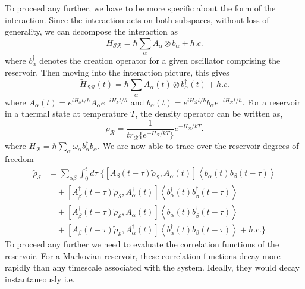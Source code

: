 To proceed any further, we have to be more specific about the form of the interaction. Since the interaction acts on both subspaces, without loss of generality, we can decompose the interaction as 
%
\begin{equation}\label{Tensor_Product_Interaction}
H_{\mathcal{SR}} = \hbar  \sum_\alpha A_\alpha \otimes b_\alpha^\dagger + h.c. 
\end{equation}
%
where $b_\alpha^\dagger$ denotes the creation operator for a given oscillator comprising the reservoir. Then moving into the interaction picture, this gives
\begin{equation}
\tilde{H}_{\mathcal{SR}}(t)  =  \hbar  \sum_\alpha A_\alpha(t) \otimes b_\alpha^\dagger(t) + h.c.
\end{equation}
where $A_\alpha(t)= e^{i H_{\mathcal{S}} t / \hbar } A_\alpha e^{- i H_{\mathcal{S}} t /\hbar }$ and $b_\alpha(t) = e^{i H_{\mathcal{R}} t/ \hbar } b_\alpha e^{-i H_{\mathcal{R}} t /\hbar }$. For a reservoir in a thermal state at temperature $T$, the density operator can be written as,
%
\begin{equation}
\rho_{\mathcal{R}} = \frac{1}{tr_{\mathcal{R}} \lbrace e^{-H_{\mathcal{R}} / k T} \rbrace} e^{-H_{\mathcal{R}} / k T}.
\end{equation}
%
where $H_{\mathcal{R}} = \hbar \sum_\alpha \omega_\alpha b_\alpha^\dagger b_\alpha$. We are now able to trace over the reservoir degrees of freedom
%
\begin{align}
\dot{\tilde{\rho}}_{\mathcal{S}} & =  \sum_{\alpha \beta } \int_{0}^{t} d\tau \;  \biggl\lbrace \left[   A_\beta (t-\tau) \tilde{\rho}_{\mathcal{S}} , A_\alpha(t) \right] \left\langle b_\alpha(t) b_\beta(t-\tau) \right\rangle \nonumber \\
& \quad + \left[   A_\beta^\dagger (t-\tau) \tilde{\rho}_{\mathcal{S}} , A_\alpha^\dagger(t) \right] \left\langle b_\alpha^\dagger(t) b_\beta^\dagger (t-\tau) \right\rangle  \nonumber \\
& \quad + \left[  A_{\beta}^\dagger(t-\tau) \tilde{\rho}_{\mathcal{S}} , A_\alpha(t)   \right] \left\langle b_\alpha(t) b_\beta^\dagger(t-\tau)  \right\rangle \nonumber \\
& \quad + \left[  A_{\beta}(t-\tau) \tilde{\rho}_{\mathcal{S}} , A_\alpha^\dagger(t)   \right] \left\langle b_\alpha^\dagger(t) b_\beta(t-\tau)  \right\rangle + h.c. \biggr\rbrace 
\label{Eq:rho1}
\end{align} 
%
To proceed any further we need to evaluate the correlation functions of the reservoir. For a Markovian reservoir, these correlation functions decay more rapidly than any timescale associated with the system. Ideally, they would decay instantaneously i.e. \cite{StatMethQOI}
